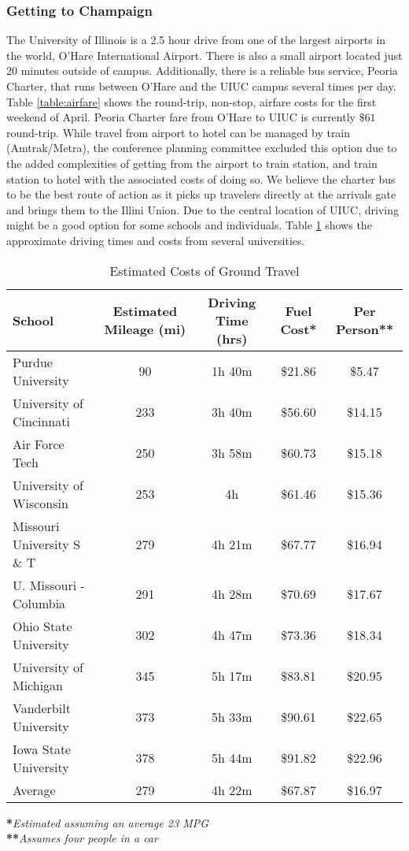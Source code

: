 \subsubsection{Getting to Champaign}
The University of Illinois is a 2.5 hour drive from one of the largest airports in the world, O'Hare International Airport. There is also a small airport located just 20 minutes outside of campus. Additionally, there is a reliable bus service, Peoria Charter, that runs between O'Hare and the UIUC campus several times per day. Table \ref{table:airfare} shows the round-trip, non-stop, airfare costs for the first weekend of April. Peoria Charter fare from O'Hare to UIUC is currently $\$61$ round-trip. While travel from airport to hotel can be managed by train (Amtrak/Metra), the conference planning committee excluded this option due to the added complexities of getting from the airport to train station, and train station to hotel with the associated costs of doing so. We believe the charter bus to be the best route of action as it picks up travelers directly at the arrivals gate and brings them to the Illini Union. Due to the central location of UIUC, driving might be a good option for some schools and individuals. Table \ref{table:ground} shows the approximate driving times and costs from several universities. 

\begin{table}[H]
\caption{Estimated Costs of Ground Travel}
\label{table:ground}
   \begin{tabular}{lcccc}
   \hline\hline
   \textbf{School}&\textbf{Estimated Mileage (mi)}&\textbf{Driving Time (hrs)}&\textbf{Fuel Cost*}&\textbf{Per Person**}\\
   \hline\hline
    Purdue University&90&1h 40m&\$21.86&\$5.47\\
    University of Cincinnati&233& 3h 40m&\$56.60&\$14.15\\
    Air Force Tech &250&3h 58m&\$60.73&\$15.18\\
    University of Wisconsin&253&4h&\$61.46&\$15.36\\
    Missouri University S \& T &279&4h 21m&\$67.77&\$16.94\\
    U. Missouri - Columbia&291&4h 28m&\$70.69&\$17.67\\
    Ohio State University&302&4h 47m&\$73.36&\$18.34\\
    University of Michigan&345&5h 17m&\$83.81&\$20.95\\
    Vanderbilt University&373&5h 33m&\$90.61&\$22.65\\
    Iowa State University&378&5h 44m&\$91.82&\$22.96\\
    \hline
    Average&279&4h 22m&\$67.87&\$16.97

    \end{tabular} 
\end{table}
\noindent\textbf{*}\textit{Estimated assuming an average 23 MPG}\\
\textbf{**}\textit{Assumes four people in a car}

